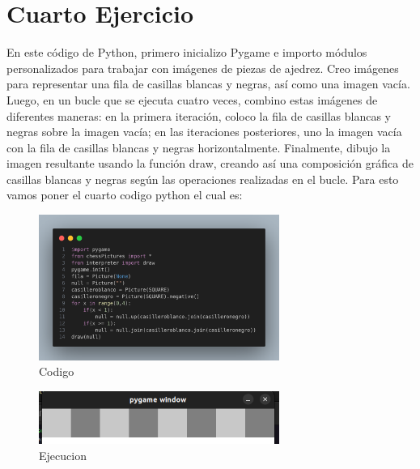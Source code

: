 \documentclass[10pt, a4paper]{article}
\begin{document}
\section{Cuarto Ejercicio}
En este código de Python, primero inicializo Pygame e importo módulos personalizados para trabajar con imágenes de piezas de ajedrez. Creo imágenes para representar una fila de casillas blancas y negras, así como una imagen vacía. Luego, en un bucle que se ejecuta cuatro veces, combino estas imágenes de diferentes maneras: en la primera iteración, coloco la fila de casillas blancas y negras sobre la imagen vacía; en las iteraciones posteriores, uno la imagen vacía con la fila de casillas blancas y negras horizontalmente. Finalmente, dibujo la imagen resultante usando la función draw, creando así una composición gráfica de casillas blancas y negras según las operaciones realizadas en el bucle.
\singlespacing
Para esto vamos poner el cuarto codigo python el cual es:  
\begin{figure}[H]
  \centering
  \includegraphics[width=0.7\textwidth]{img/Ej4.png}
  \caption{Codigo}
\end{figure}

\begin{figure}[H]
  \centering
  \includegraphics[width=0.7\textwidth]{img/Ejercicio4.png}
  \caption{Ejecucion}
\end{figure}
\end{document}
